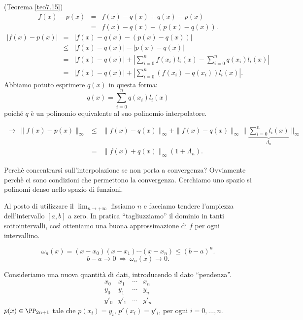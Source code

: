 \begin{dimo} (Teorema \ref{teo7.15})
\[
\begin{array}{lcl}
f(x) - p(x) & = & f(x) - q(x) + q(x) - p(x) \\
& = & f(x) - q(x) - (p(x) - q(x)).
\end{array}
\]
\[
\begin{array}{lcl}
|f(x) - p(x)| & = & |f(x) - q(x) -(p(x) - q(x))| \\
& \leq & |f(x) - q(x)| - |p(x) - q(x)| \\
& = & |f(x) - q(x)| + \left| \sum_{i = 0}^nf(x_i) l_i(x) 
-\sum_{i=0}^nq(x_i)l_i(x)\right| \\
& = & | f(x) -q(x)| + \left| \sum_{i=0}^n (f(x_i)-q(x_i))l_i(x)\right|.
\end{array}
\]
Abbiamo potuto esprimere $q(x)$ in questa forma:
\[q(x) = \sum_{i=0}^nq(x_i)l_i(x)\]
poiché $q$ è un polinomio equivalente al suo polinomio
interpolatore.

\[
\begin{array}{lcl}
\longrightarrow \ 
\|f(x) - p(x)\|_{\infty} & \leq & \|f(x) - q(x)\|_\infty + \|f(x)- q(x)\|_{\infty}
\|\underbrace{\sum_{i=0}^n l_i(x)}_{\Lambda_n}\|_{\infty}\\
& = & \|f(x) + q(x)\|_\infty(1 + \Lambda_n).  
\end{array}
\]
\end{dimo}


Perchè concentrarsi sull'interpolazione se non porta a convergenza? Ovviamente
perchè ci sono condizioni che permettono la convergenza. Cerchiamo uno spazio
si polinomi denso nello spazio di funzioni.

Al posto di utilizzare il $\lim_{n \to + \infty}$ fissiamo $n$ e facciamo tendere
l'ampiezza dell'intervallo $[a,b]$ a zero. In pratica ``tagliuzziamo'' il
dominio in tanti sottointervalli, così otteniamo una buona approssimazione 
di $f$ per ogni intervallino.

\[\omega_n(x) = (x-x_0)(x-x_1)\cdots (x-x_n) \leq (b-a)^n.\]
\[b-a \longrightarrow 0 \ \Longrightarrow \ \omega_n(x) \longrightarrow 0.\]

Consideriamo una nuova quantità di dati, introducendo il dato ``pendenza''.
\[\begin{array}{ccccc}
x_0 & x_1 & \cdots & x_n   \\
y_0 & y_1 & \cdots & y_n  \\
y'_0 & y'_1 & \cdots & y'_n  
\end{array}\]
$p(x) \in \PP_{2n +1}$ tale che $p(x_i) = y_i,\, p'(x_i) = y'_i$, per ogni $i =
0, \ldots, n$.

